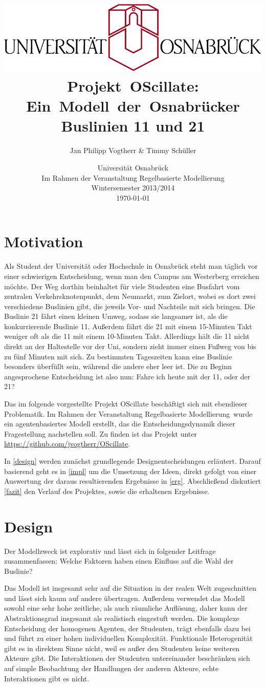 \documentclass[12pt,a4paper]{scrartcl}
\author{Jan Philipp Vogtherr \& Timmy Schüller\vspace{0.5cm}}
\title{\includegraphics[scale=0.8]{unilogo.pdf}\vspace*{1cm}
\mbox{Projekt OScillate:} \mbox{Ein Modell der Osnabrücker} Buslinien 11 und 21\vspace{0.3cm}}
\date{Universität Osnabrück \\
Im Rahmen der Veranstaltung \glqq Regelbasierte Modellierung\grqq \\
\vspace*{0.4cm}
Wintersemester 2013/2014 \\
\today}
\begin{document}
\maketitle
\thispagestyle{empty}
\newpage
\tableofcontents
\newpage

\section{Motivation}
Als Student der Universität oder Hochschule in Osnabrück steht man täglich vor einer schwierigen Entscheidung, wenn man den Campus am Westerberg erreichen möchte. Der Weg dorthin beinhaltet für viele Studenten eine Busfahrt vom zentralen Verkehrsknotenpunkt, dem Neumarkt, zum Zielort, wobei es dort zwei verschiedene Buslinien gibt, die jeweils Vor- und Nachteile mit sich bringen. Die Buslinie 21 fährt einen kleinen Umweg, sodass sie langsamer ist, als die konkurrierende Buslinie 11. Außerdem fährt die 21 mit einem 15-Minuten Takt weniger oft als die 11 mit einem 10-Minuten Takt. Allerdings hält die 11 nicht direkt an der Haltestelle vor der Uni, sondern zieht immer einen Fußweg von bis zu fünf Minuten mit sich. Zu bestimmten Tageszeiten kann eine Buslinie besonders überfüllt sein, während die andere eher leer ist. Die zu Beginn angesprochene Entscheidung ist also nun: \glqq Fahre ich heute mit der 11, oder der 21?\grqq

Das im folgende vorgestellte Projekt OScillate beschäftigt sich mit ebendieser Problematik. Im Rahmen der Veranstaltung \glqq Regelbasierte Modellierung\grqq~wurde ein agentenbasiertes Modell erstellt, das die Entscheidungsdynamik dieser Fragestellung nachstellen soll. Zu finden ist das Projekt unter \url{https://github.com/jvogtherr/OScillate}.

In \autoref{design} werden zunächst grundlegende Designentscheidungen erläutert. Darauf basierend geht es in \autoref{impl} um die Umsetzung der Ideen, direkt gefolgt von einer Auswertung der daraus resultierenden Ergebnisse in \autoref{erg}. Abschließend diskutiert \autoref{fazit} den Verlauf des Projektes, sowie die erhaltenen Ergebnisse.

\section{Design}\label{design}
Der Modellzweck ist explorativ und lässt sich in folgender Leitfrage zusammenfassen: \glqq Welche Faktoren haben einen Einfluss auf die Wahl der Buslinie?\grqq 

Das Modell ist insgesamt sehr auf die Situation in der realen Welt zugeschnitten und lässt sich kaum auf andere übertragen. Außerdem verwendet das Modell sowohl eine sehr hohe zeitliche, als auch räumliche Auflösung, daher kann der Abstraktionsgrad insgesamt als realistisch eingestuft werden. Die komplexe Entscheidung der homogenen Agenten, der Studenten, trägt ebenfalls dazu bei und führt zu einer hohen individuellen Komplexität. Funktionale Heterogenität gibt es in direktem Sinne nicht, weil es außer den Studenten keine weiteren Akteure gibt. Die Interaktionen der Studenten untereinander beschränken sich auf simple Beobachtung der Handlungen der anderen Akteure, echte Interaktionen gibt es nicht.
\end{document}
